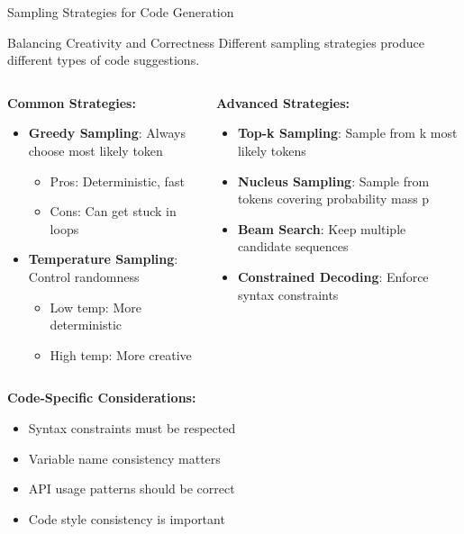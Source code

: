 \documentclass{beamer}
\begin{document}
\begin{frame}[t]{Sampling Strategies for Code Generation}
    \begin{block}{Balancing Creativity and Correctness}
        Different sampling strategies produce different types of code suggestions.
    \end{block}
    
    \begin{columns}[t]
        \begin{column}{0.5\textwidth}
            \textbf{Common Strategies:}
            \begin{itemize}
                \item \textbf{Greedy Sampling}: Always choose most likely token
                \begin{itemize}
                    \item Pros: Deterministic, fast
                    \item Cons: Can get stuck in loops
                \end{itemize}
                
                \item \textbf{Temperature Sampling}: Control randomness
                \begin{itemize}
                    \item Low temp: More deterministic
                    \item High temp: More creative
                \end{itemize}
            \end{itemize}
        \end{column}
        \begin{column}{0.5\textwidth}
            \textbf{Advanced Strategies:}
            \begin{itemize}
                \item \textbf{Top-k Sampling}: Sample from k most likely tokens
                \item \textbf{Nucleus Sampling}: Sample from tokens covering probability mass p
                \item \textbf{Beam Search}: Keep multiple candidate sequences
                \item \textbf{Constrained Decoding}: Enforce syntax constraints
            \end{itemize}
        \end{column}
    \end{columns}
    
    \vspace{0.3cm}
    \textbf{Code-Specific Considerations:}
    \begin{itemize}
        \item Syntax constraints must be respected
        \item Variable name consistency matters
        \item API usage patterns should be correct
        \item Code style consistency is important
    \end{itemize}
\end{frame}
\end{document}
